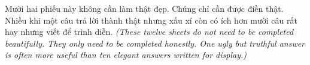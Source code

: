 
\begin{baihoc}
Mười hai phiếu này không cần làm thật đẹp. Chúng chỉ cần được điền thật. Nhiều khi một câu trả lời thành thật nhưng xấu xí còn có ích hơn mười câu rất hay nhưng viết để trình diễn.
\textit{(These twelve sheets do not need to be completed beautifully. They only need to be completed honestly. One ugly but truthful answer is often more useful than ten elegant answers written for display.)}
\end{baihoc}

\ngancach